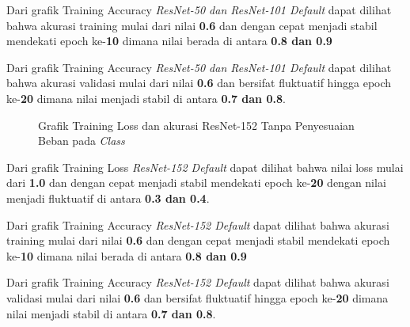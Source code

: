 Dari grafik Training Accuracy \emph{ResNet-50 dan ResNet-101 Default} dapat dilihat bahwa akurasi training mulai dari nilai \textbf{0.6} dan dengan cepat menjadi stabil mendekati epoch ke-\textbf{10} dimana nilai berada di antara \textbf{0.8 dan 0.9} 

Dari grafik Training Accuracy \emph{ResNet-50 dan ResNet-101 Default} dapat dilihat bahwa akurasi validasi mulai dari nilai \textbf{0.6} dan bersifat fluktuatif hingga epoch ke-\textbf{20} dimana nilai menjadi stabil di antara \textbf{0.7 dan 0.8}.
\pagebreak

\begin{figure}[hbtp]
	\caption{Grafik Training Loss dan akurasi ResNet-152 Tanpa Penyesuaian Beban pada \emph{Class}}
	\label{Fig:GraphTrainingDefPt3}
\end{figure}
Dari grafik Training Loss \emph{ResNet-152 Default} dapat dilihat bahwa nilai loss mulai dari \textbf{1.0} dan dengan cepat menjadi stabil mendekati epoch ke-\textbf{20} dengan nilai menjadi fluktuatif di antara \textbf{0.3 dan 0.4}.

Dari grafik Training Accuracy \emph{ResNet-152 Default} dapat dilihat bahwa akurasi training mulai dari nilai \textbf{0.6} dan dengan cepat menjadi stabil mendekati epoch ke-\textbf{10} dimana nilai berada di antara \textbf{0.8 dan 0.9} 

Dari grafik Training Accuracy \emph{ResNet-152 Default} dapat dilihat bahwa akurasi validasi mulai dari nilai \textbf{0.6} dan bersifat fluktuatif hingga epoch ke-\textbf{20} dimana nilai menjadi stabil di antara \textbf{0.7 dan 0.8}.
\pagebreak

